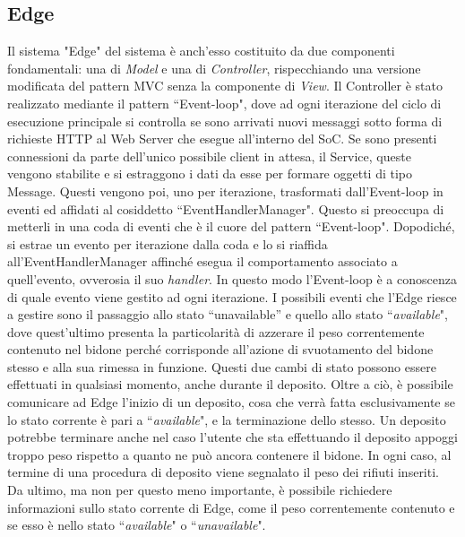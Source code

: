 \documentclass[a4paper, 12pt]{report}
\begin{document}
			\subsection{Edge}
			Il sistema "Edge" del sistema è anch'esso costituito da due componenti fondamentali: una di
			\textit{Model} e una di \textit{Controller}, rispecchiando una versione modificata del
			pattern MVC senza la componente di \textit{View}.\newline
			Il Controller è stato realizzato mediante il pattern ``Event-loop", dove ad ogni iterazione
			del ciclo di esecuzione principale si controlla se sono arrivati nuovi messaggi sotto forma
			di richieste HTTP al Web Server che esegue all'interno del SoC. Se sono presenti connessioni
			da parte dell'unico possibile client in attesa, il Service, queste vengono stabilite e si
			estraggono i dati da esse per formare oggetti di tipo Message. Questi vengono poi, uno per
			iterazione, trasformati dall'Event-loop in eventi ed affidati al cosiddetto ``EventHandlerManager". 
			Questo si preoccupa di metterli in una coda di eventi che è il cuore
			del pattern ``Event-loop". Dopodiché, si estrae un evento per iterazione dalla coda e lo si
			riaffida all'EventHandlerManager affinché esegua il comportamento associato a
			quell'evento, ovverosia il suo \textit{handler}. In questo modo l'Event-loop è a conoscenza
			di quale evento viene gestito ad ogni iterazione.\newline
			I possibili eventi che
			l'Edge riesce a gestire sono il passaggio allo stato ``unavailable'' e quello allo
			stato ``\textit{available}", dove quest'ultimo presenta la particolarità di azzerare il peso
			correntemente contenuto nel bidone perché corrisponde all'azione di svuotamento del bidone
			stesso e alla sua rimessa in funzione. Questi due cambi di stato possono essere effettuati
			in qualsiasi momento, anche durante il deposito.
			Oltre a ciò, è possibile comunicare ad Edge l'inizio
			di un deposito, cosa che verrà fatta esclusivamente se lo stato corrente è pari a
			``\textit{available}", e la terminazione dello stesso. Un deposito potrebbe terminare anche nel
			caso l'utente che sta effettuando il deposito appoggi troppo peso rispetto a quanto ne può
			ancora contenere il bidone. In ogni caso, al termine di una procedura di deposito viene
			segnalato il peso dei rifiuti inseriti. Da ultimo, ma non per questo meno importante, è
			possibile richiedere informazioni sullo stato corrente di Edge, come il peso correntemente
			contenuto e se esso è nello stato ``\textit{available}" o ``\textit{unavailable}".\newline
\end{document}
